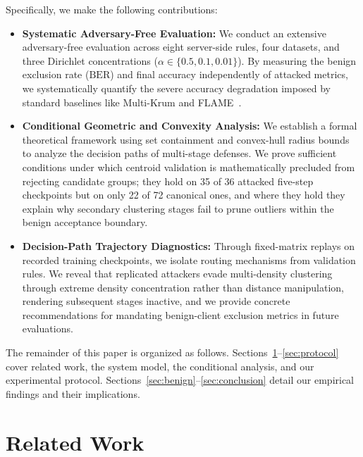 \documentclass[journal]{IEEEtran}
\newcommand{\BER}{\mathrm{BER}}
\begin{document}
Specifically, we make the following contributions:
\begin{itemize}
    \item \textbf{Systematic Adversary-Free Evaluation:} We conduct an extensive adversary-free evaluation across eight server-side rules, four datasets, and three Dirichlet concentrations ($\alpha\in\{0.5,0.1,0.01\}$). By measuring the benign exclusion rate ($\BER$) and final accuracy independently of attacked metrics, we systematically quantify the severe accuracy degradation imposed by standard baselines like Multi-Krum and FLAME~\cite{nguyen2022flame}.
    \item \textbf{Conditional Geometric and Convexity Analysis:} We establish a formal theoretical framework using set containment and convex-hull radius bounds to analyze the decision paths of multi-stage defenses. We prove sufficient conditions under which centroid validation is mathematically precluded from rejecting candidate groups; they hold on 35 of 36 attacked five-step checkpoints but on only 22 of 72 canonical ones, and where they hold they explain why secondary clustering stages fail to prune outliers within the benign acceptance boundary.
    \item \textbf{Decision-Path Trajectory Diagnostics:} Through fixed-matrix replays on recorded training checkpoints, we isolate routing mechanisms from validation rules. We reveal that replicated attackers evade multi-density clustering through extreme density concentration rather than distance manipulation, rendering subsequent stages inactive, and we provide concrete recommendations for mandating benign-client exclusion metrics in future evaluations.
\end{itemize}

The remainder of this paper is organized as follows. Sections~\ref{sec:related}--\ref{sec:protocol} cover related work, the system model, the conditional analysis, and our experimental protocol. Sections~\ref{sec:benign}--\ref{sec:conclusion} detail our empirical findings and their implications.

\section{Related Work}\label{sec:related}
\end{document}
